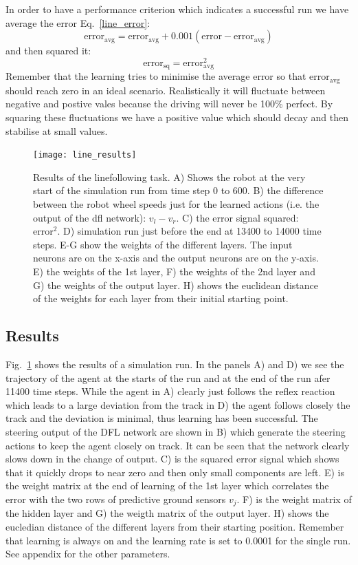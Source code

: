 \documentclass{llncs}
\begin{document}
In order to have a performance criterion which indicates a successful
run we have average the error Eq.~\ref{line_error}:
\begin{equation}
  \mathrm{error}_\mathrm{avg} =  \mathrm{error}_\mathrm{avg} + 0.001 (\mathrm{error} - \mathrm{error}_\mathrm{avg}) 
\end{equation}
and then squared it:
\begin{equation}
  \mathrm{error}_\mathrm{sq} =  \mathrm{error}_\mathrm{avg}^2 \label{line_sqerr}
\end{equation}
Remember that the learning tries to minimise the average error so that $\mathrm{error}_\mathrm{avg}$
should reach zero in an ideal scenario. Realistically it will fluctuate between negative and
postive vales because the driving will never be 100\% perfect. By squaring these fluctuations
we have a positive value which should decay and then stabilise at small values.


\begin{figure}[h!]
  \centering
  \texttt{[image: line\_results]}
  \caption{Results of the linefollowing task. A) Shows the robot at
    the very start of the simulation run from time step 0 to 600.
    B) the difference between the robot wheel speeds just for the learned
    actions (i.e. the output of the dfl network): $v_l-v_r$.
    C) the error signal squared: $\mathrm{error}^2$.
    D) simulation run just before the end at 13400 to 14000 time steps.
    E-G show the weights of the different layers. The input neurons are on the x-axis
    and the output neurons are on the y-axis.
    E) the weights of the 1st layer, F) the weights of the 2nd layer and
    G) the weights of the output layer.
        H) shows the euclidean distance of the weights for each layer from their initial starting point.
    \label{line_results}}
\end{figure}



\subsection{Results}
Fig.~\ref{line_results} shows the results of a simulation run. In the panels
A) and D) we see the trajectory of the agent at the starts of the run and
at the end of the run afer 11400 time steps. While the agent in A) clearly
just follows the reflex reaction which leads to a large deviation from the track
in D) the agent follows closely the track and the deviation is minimal, thus
learning has been successful. The steering output of the DFL network are shown
in B) which generate the steering actions to keep the agent closely on track.
It can be seen that the network clearly slows down in the change of output.
C) is the squared error signal which shows that it quickly drops to near zero
and then only small components are left. E) is the weight matrix at the end
of learning of the 1st layer which correlates the error with the two rows of
predictive ground sensors $v_j$. F) is the weight matrix of the hidden layer and G)
the weigth matrix of the output layer. H) shows the eucledian distance of the
different layers from their starting position. Remember that learning is
always on and the learning rate is set to 0.0001 for the single run. See appendix
for the other parameters.
\end{document}
